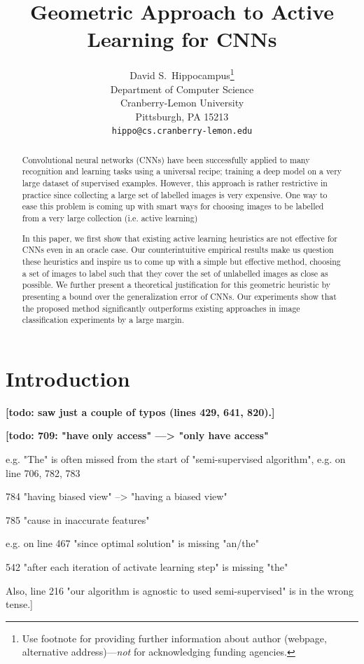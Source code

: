 \documentclass{article}
\title{Geometric Approach to Active Learning for CNNs}
\author{
  David S.~Hippocampus\thanks{Use footnote for providing further
    information about author (webpage, alternative
    address)---\emph{not} for acknowledging funding agencies.} \\
  Department of Computer Science\\
  Cranberry-Lemon University\\
  Pittsburgh, PA 15213 \\
  \texttt{hippo@cs.cranberry-lemon.edu} \\
}
\makeatletter
\newcommand*{\ie}{i.e.\@\xspace}
\newcommand{\todo}[1]{{\bf \color{red}[todo: #1]}}
\makeatother
\begin{document}

\maketitle

\begin{abstract}
Convolutional neural networks (CNNs) have been successfully applied to many recognition and learning tasks using a universal recipe; training a deep model on a very large dataset of supervised examples. However, this approach is rather restrictive in practice since collecting a large set of labelled images is very expensive. One way to ease this problem is coming up with smart ways for choosing images to be labelled from a very large collection (\ie active learning)

In this paper, we first show that existing active learning heuristics are not effective for CNNs even in an oracle case. Our counterintuitive empirical results make us question these heuristics and inspire us to come up with a simple but effective method, choosing a set of images to label such that they cover the set of unlabelled images as close as possible. We further present a theoretical justification for this geometric heuristic by presenting a bound over the generalization error of CNNs. Our experiments show that the proposed method significantly outperforms existing approaches in image classification experiments by a large margin.
\end{abstract}

\section{Introduction}
\todo{ saw just a couple of typos (lines 429, 641, 820).}
\todo{709: "have only access" ---> "only have access"

e.g. "The" is often missed from the start of "semi-supervised algorithm", e.g. on line 706, 782, 783

784 "having biased view" --> "having a biased view" 

785 "cause in inaccurate features"

e.g. on line 467 "since optimal solution" is missing "an/the"

542 "after each iteration of activate learning step" is missing "the"

Also, line 216 "our algorithm is agnostic to used semi-supervised" is in the wrong tense.}
\end{document}
